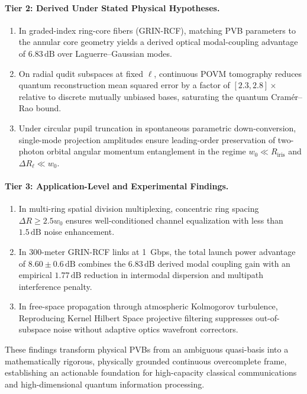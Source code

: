 \documentclass{optica-article}
\begin{document}
\paragraph{Tier 2: Derived Under Stated Physical Hypotheses.}
\begin{enumerate}
    \item In graded-index ring-core fibers (GRIN-RCF), matching PVB parameters to the annular core geometry yields a derived optical modal-coupling advantage of $6.83\,\text{dB}$ over Laguerre--Gaussian modes.
    \item On radial qudit subspaces at fixed $\ell$, continuous POVM tomography reduces quantum reconstruction mean squared error by a factor of $[2.3, 2.8]\times$ relative to discrete mutually unbiased bases, saturating the quantum Cramér--Rao bound.
    \item Under circular pupil truncation in spontaneous parametric down-conversion, single-mode projection amplitudes ensure leading-order preservation of two-photon orbital angular momentum entanglement in the regime $w_0 \ll R_{\text{iris}}$ and $\Delta R_\ell \ll w_0$.
\end{enumerate}

\paragraph{Tier 3: Application-Level and Experimental Findings.}
\begin{enumerate}
    \item In multi-ring spatial division multiplexing, concentric ring spacing $\Delta R \ge 2.5 w_0$ ensures well-conditioned channel equalization with less than $1.5\,\text{dB}$ noise enhancement.
    \item In 300-meter GRIN-RCF links at 1~Gbps, the total launch power advantage of $8.60 \pm 0.6\,\text{dB}$ combines the $6.83\,\text{dB}$ derived modal coupling gain with an empirical $1.77\,\text{dB}$ reduction in intermodal dispersion and multipath interference penalty.
    \item In free-space propagation through atmospheric Kolmogorov turbulence, Reproducing Kernel Hilbert Space projective filtering suppresses out-of-subspace noise without adaptive optics wavefront correctors.
\end{enumerate}

These findings transform physical PVBs from an ambiguous quasi-basis into a mathematically rigorous, physically grounded continuous overcomplete frame, establishing an actionable foundation for high-capacity classical communications and high-dimensional quantum information processing.
\end{document}
